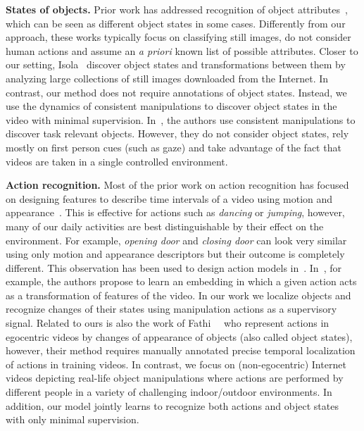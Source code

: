 \noindent\textbf{States of objects.}
Prior work has addressed recognition of object attributes~\cite{Farhadi09ObjectsAttrib,Parikh2011Relattrib,patterson2014sun}, which can be seen as different object states in some cases. 
%
%
Differently from our approach, these works typically focus on classifying still images, do not consider human actions and assume an {\em a priori} known list of possible attributes. %
Closer to our setting, Isola~\etal\cite{Isola15State} discover object states and transformations between them by analyzing large collections of still images downloaded from the Internet. 
In contrast, our method does not require annotations of object states. %
Instead, we use the dynamics of consistent manipulations to discover object states in the video with minimal supervision. %
In~\cite{dima2014youdo}, the authors use consistent manipulations to discover task relevant objects.
However, they do not consider object states, rely mostly on first person cues (such as gaze) and take advantage of the fact that videos are taken in a single controlled environment.


\noindent\textbf{Action recognition.}
Most of the prior work on action recognition has focused on designing features to describe time intervals of a video using motion and appearance~\cite{laptev08learning,simonyan2014two,tran2015learning,Wang13action}. This is effective for actions  such as \textit{dancing} or \textit{jumping},
%
however, many of our daily activities are best distinguishable by their effect on the environment.
For example, \textit{opening door}  and \textit{closing door} can look very similar using only motion and appearance descriptors but their outcome is completely different.
This observation has been used to design action models in~\cite{fathi11modeling,fernando15vidDarwin,Wang16Transformation}.
In~\cite{Wang16Transformation}, for example, the authors propose to learn an embedding in which a given action acts as a transformation of  features of the video.
In our work we localize objects and recognize  changes of their states using manipulation actions as a supervisory signal.
Related to ours is also the work of Fathi~\etal~\cite{fathi11modeling} who represent actions in egocentric videos by changes of appearance of objects (also called object states), however, their method requires manually annotated precise temporal localization of actions in training videos. 
In contrast, we focus on (non-egocentric) Internet videos depicting real-life object manipulations where actions are performed by different people in a variety of challenging indoor/outdoor environments. In addition, our model jointly learns to recognize both actions and object states with only minimal supervision.

